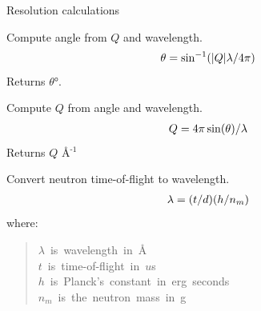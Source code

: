 \documentclass[letterpaper,10pt,english]{sphinxmanual}
\begin{document}
\label{api/resolution:module-refl1d.resolution}
Resolution calculations

\begin{fulllineitems}
\label{api/resolution:refl1d.resolution.FWHM2sigma}
\end{fulllineitems}


\begin{fulllineitems}
\label{api/resolution:refl1d.resolution.QL2T}
Compute angle from $Q$ and wavelength.
\begin{gather}
\begin{split}\theta = \sin^{-1}( |Q| \lambda / 4 \pi )\end{split}\notag
\end{gather}
Returns $\theta$°.

\end{fulllineitems}


\begin{fulllineitems}
\label{api/resolution:refl1d.resolution.TL2Q}
Compute $Q$ from angle and wavelength.
\begin{gather}
\begin{split}Q = 4 \pi \sin(\theta) / \lambda\end{split}\notag
\end{gather}
Returns $Q$ Å$^{\text{-1}}$

\end{fulllineitems}


\begin{fulllineitems}
\label{api/resolution:refl1d.resolution.TOF2L}
Convert neutron time-of-flight to wavelength.
\begin{gather}
\begin{split}\lambda = (t/d) (h/n_m)\end{split}\notag
\end{gather}
where:
\begin{quote}
{\raggedright{}$\lambda$~is~wavelength~in~Å\\
$t$~is~time-of-flight~in~$u$s\\
$h$~is~Planck's~constant~in~erg~seconds\\
$n_m$~is~the~neutron~mass~in~g}
\end{quote}

\end{fulllineitems}
\end{document}
